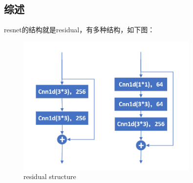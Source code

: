 \documentclass[11pt]{ctexart}
\begin{document}
\subsection{综述}
resnet的结构就是residual，有多种结构，如下图：
\begin{figure}[H]

\begin{center}
\includegraphics[width=0.8\textwidth]{residual1.PNG}
\end{center}
\caption{residual structure}
\label{FIG.2}
\end{figure}
\end{document}
